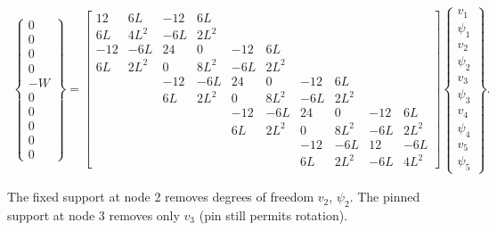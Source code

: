 \documentclass[10pt,letterpaper]{article}
\begin{document}
	\begin{align} 
		\begin{Bmatrix}
			0 \\
			0 \\
			0 \\
			0 \\
			-W \\
			0 \\
			0 \\
			0 \\
			0 \\
			0
		\end{Bmatrix} = \begin{bmatrix}
12 & 6L & -12 & 6L & & & & & & \\
6L & 4L^2 & -6L & 2L^2 & & & & & & \\
-12 & -6L & 24 & 0 & -12 & 6L & & & & \\
6L & 2L^2 & 0 & 8L^2 & -6L & 2L^2 & & & & \\
 & & -12 & -6L & 24 & 0 & -12 & 6L & & \\
 & & 6L & 2L^2 & 0 & 8L^2 & -6L & 2L^2 & & \\
 & & & & -12 & -6L & 24 & 0 & -12 & 6L \\
 & & & & 6L & 2L^2 & 0 & 8L^2 & -6L & 2L^2 \\
 & & & & & & -12 & -6L & 12 & -6L \\
 & & & & & & 6L & 2L^2 & -6L & 4L^2
		\end{bmatrix} \begin{Bmatrix}
			v_1 \\
			\psi_1 \\
			v_2 \\
			\psi_2 \\
			v_3 \\
			\psi_3 \\
			v_4 \\
			\psi_4 \\
			v_5 \\
			\psi_5
		\end{Bmatrix} .
	\end{align}

	The fixed support at node 2 removes degrees of freedom $v_2$, $\psi_2$. The pinned support at node 3 removes only $v_3$ (pin still permits rotation).
\end{document}

